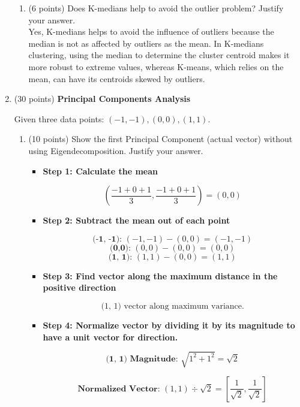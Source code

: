 \documentclass[11pt]{article}
\begin{document}
\begin{enumerate}
\begin{enumerate}
        \item (6 points) Does K-medians help to avoid the outlier
        problem? Justify your answer.\\

        Yes, K-medians helps to avoid the influence of outliers because the median is not as affected by outliers as the mean. In K-medians clustering, using the median to determine the cluster centroid makes it more robust to extreme values, whereas K-means, which relies on the mean, can have its centroids skewed by outliers.

    \end{enumerate}
    

    \item (30 points) \textbf{ Principal Components Analysis}
    
    Given three data points: $(-1, -1), (0,0), (1,1)$.

    \begin{enumerate}
        \item (10 points) Show the first Principal Component
        (actual vector) without using Eigendecomposition. Justify
        your answer.

        \begin{itemize}
            \item \textbf{Step 1: Calculate the mean}

            \[(\frac{-1+0+1}{3}, \frac{-1+0+1}{3}) = (0,0)\]

            \item \textbf{Step 2: Subtract the mean out of each point}

            \[\textbf{(-1, -1): } (-1, -1) - (0, 0) = (-1, -1)\]
            \[\textbf{(0,0): } (0,0) - (0, 0) = (0,0)\]
            \[\textbf{(1, 1): } (1, 1) - (0, 0) = (1, 1)\]

            \item \textbf{Step 3: Find vector along the maximum distance in the positive direction}

            \[\text{(1, 1)  vector along maximum variance.}\]

            \item \textbf{Step 4: Normalize vector by dividing it by its magnitude to have a unit vector for direction.}

            \[\textbf{(1, 1) Magnitude: } \sqrt{1^2 + 1^2} = \sqrt{2}\]
    
            \[\textbf{Normalized Vector: } (1, 1) \div \sqrt{2} = [\frac{1}{\sqrt{2}}, \frac{1}{\sqrt{2}}]\]\\


\end{itemize}
\end{enumerate}
\end{enumerate}
\end{document}
